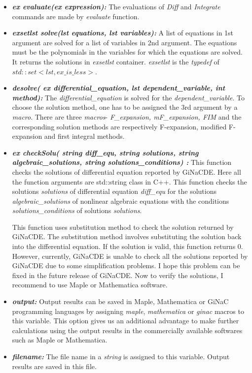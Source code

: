 \documentclass[prd,aps,floats,showkeys,nofootinbib,notitlepage]{revtex4-2}
\begin{document}
\begin{itemize}
		\item[] {\em \textbf{ex evaluate(ex expression):}} The evaluations of {\em Diff} and {\em Integrate} commands are made by {\em evaluate} function.
		
		\item[] {\em \textbf{exsetlst solve(lst equations, lst variables):}} A list of equations in 1st argument are solved for a list of variables in 2nd argument. The equations must be the polynomials in the variables for which the equations are solved. It returns the solutions in {\em exsetlst} container. {\em exsetlst} is the {\em typedef} of ${ std::set< lst,ex\_is\_less>}$.  
		
		\item[] {\em \textbf{desolve( ex differential\_equation, lst dependent\_variable, int method):}} The {\em differential\_equation} is solved for the {\em dependent\_variable}. To choose the solution method, one has to be assigned the 3rd argument by a {\em macro}. There are three {\em macros}- {\em F\_expansion, mF\_expansion, FIM} and the corresponding solution methods are respectively F-expansion, modified F-expansion and first integral methods. 
		
		\item[] {\em \textbf{ex checkSolu( string diff\_equ, string solutions, string algebraic\_solutions, string solutions\_conditions)
		:}}  This function checks the solutions of differential equation reported by GiNaCDE. Here all the function arguments are std::string class in C++. This function checks the solutions \textit{solutions} of differential equation \textit{diff\_equ} for the solutions \textit{algebraic\_solutions} of nonlinear algebraic equations with the conditions \textit{solutions\_conditions} of solutions \textit{solutions}.
	
	   This function uses substitution method to check the solution returned by GiNaCDE. The substitution method involves substituting the solution back into the differential equation. If the solution is valid, this function returns $0$. However, currently, GiNaCDE is unable to check all the solutions reported by GiNaCDE due to some simplification problems. I hope this problem can be fixed in the future release of GiNaCDE. Now to verify the solutions, I recommend to use Maple or Mathematica software.
		
		\item[] {\em \textbf{output:}} Output results can be saved in Maple, Mathematica or GiNaC programming languages by assigning {\em maple}, {\em mathematica}
		 or {\em ginac} {macros} to this variable. This option gives us an additional advantage to make further calculations using the output results in the commercially available softwares such as {Maple} or {Mathematica}.
		
		\item[] {\em \textbf{filename:}} The file name in a {\em string} is assigned to this variable. Output results are saved in this file. 
	\end{itemize}
	
\end{document}
